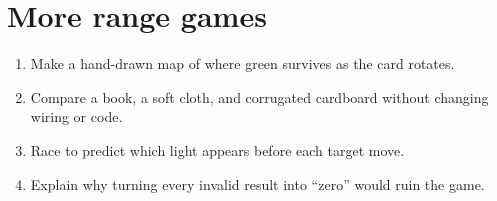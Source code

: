 \documentclass[11pt]{article}
\begin{document}
\section{More range games}

\begin{enumerate}
  \item Make a hand-drawn map of where green survives as the card rotates.
  \item Compare a book, a soft cloth, and corrugated cardboard without changing
        wiring or code.
  \item Race to predict which light appears before each target move.
  \item Explain why turning every invalid result into ``zero'' would ruin the
        game.
\end{enumerate}
\end{document}
